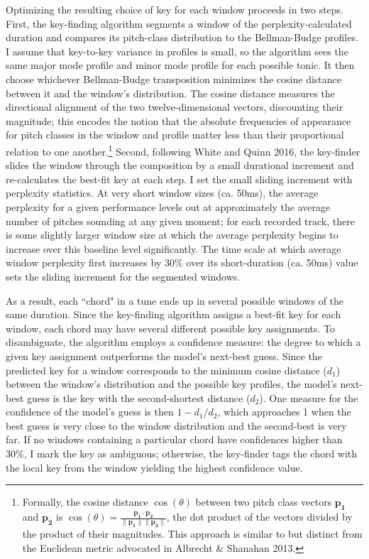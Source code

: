 Optimizing the resulting choice of key for each window proceeds in two steps.  First, the key-finding algorithm segments a window of the perplexity-calculated duration and compares its pitch-class distribution to the Bellman-Budge profiles.  I assume that key-to-key variance in profiles is small, so the algorithm sees the same major mode profile and minor mode profile for each possible tonic.  It then choose whichever Bellman-Budge transposition minimizes the cosine distance between it and the window's distribution.  The cosine distance measures the directional alignment of the two twelve-dimensional vectors, discounting their magnitude; this encodes the notion that the absolute frequencies of appearance for pitch classes in the window and profile matter less than their proportional relation to one another.\footnote{Formally, the cosine distance $\cos(\theta)$ between two pitch class vectors $\mathbf{p_1}$ and $\mathbf{p_2}$ is $\cos(\theta) = \frac{\mathbf{p_1} \cdot \mathbf{p_2}}{\| \mathbf{p_1} \| \| \mathbf{p_2} \|}$, the dot product of the vectors divided by the product of their magnitudes.  This approach is similar to but distinct from the Euclidean metric advocated in Albrecht \& Shanahan 2013.}  Second, following White and Quinn 2016, the key-finder slides the window through the composition by a small durational increment and re-calculates the best-fit key at each step.  I set the small sliding increment with perplexity statistics.  At very short window sizes (ca. 50ms), the average perplexity for a given performance levels out at approximately the average number of pitches sounding at any given moment; for each recorded track, there is some slightly larger window size at which the average perplexity begins to increase over this baseline level significantly.  The time scale at which average window perplexity first increases by $30\%$ over its short-duration (ca. 50ms) value sets the sliding increment for the segmented windows.

As a result, each ``chord" in a tune ends up in several possible windows of the same duration.  Since the key-finding algorithm assigns a best-fit key for each window, each chord may have several different possible key assignments.  To disambiguate, the algorithm employs a confidence measure: the degree to which a given key assignment outperforms the model's next-best guess.  Since the predicted key for a window corresponds to the minimum cosine distance ($d_1$) between the window's distribution and the possible key profiles, the model's next-best guess is the key with the second-shortest distance ($d_2$).  One measure for the confidence of the model's guess is then $1 - d_1/d_2$, which approaches 1 when the best guess is very close to the window distribution and the second-best is very far.  If no windows containing a particular chord have confidences higher than $30\%$, I mark the key as ambiguous; otherwise, the key-finder tags the chord with the local key from the window yielding the highest confidence value.

